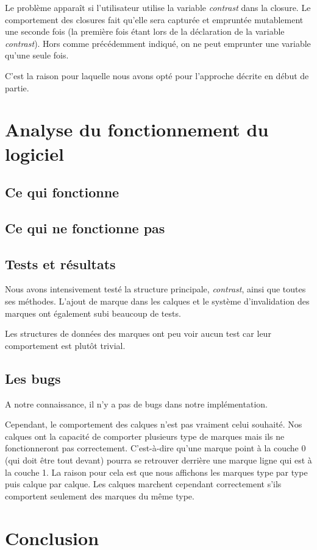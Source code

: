 \documentclass[12pt]{article}
\begin{document}
Le problème apparaît si l'utilisateur utilise la variable \textit{contrast} dans la
closure. Le comportement des closures fait qu'elle sera capturée et empruntée
mutablement une seconde fois (la première fois étant lors de la déclaration de la
variable \textit{contrast}). Hors comme précédemment indiqué, on ne peut emprunter une
variable qu'une seule fois.

C'est la raison pour laquelle nous avons opté pour l'approche décrite en début de
partie.

\section{Analyse du fonctionnement du logiciel}

\subsection{Ce qui fonctionne}

\subsection{Ce qui ne fonctionne pas}

\subsection{Tests et résultats}

Nous avons intensivement testé la structure principale, \textit{contrast}, ainsi que toutes ses méthodes.
L'ajout de marque dans les calques et le système d'invalidation des marques ont également subi beaucoup de tests.

Les structures de données des marques ont peu voir aucun test car leur comportement
est plutôt trivial.

\subsection{Les bugs}

A notre connaissance, il n'y a pas de bugs dans notre implémentation.

Cependant, le comportement des calques n'est pas vraiment celui souhaité.
Nos calques ont la capacité de comporter plusieurs type de marques mais ils ne 
fonctionneront pas correctement. C'est-à-dire qu'une marque point à la couche 0 (qui 
doit être tout devant) pourra se retrouver derrière une marque ligne qui est à la couche 1.
La raison pour cela est que nous affichons les marques type par type puis calque par
calque.
Les  calques marchent cependant correctement s'ils comportent seulement des marques du même type.

\section{Conclusion}
\printglossaries
\printbibliography
\end{document}
